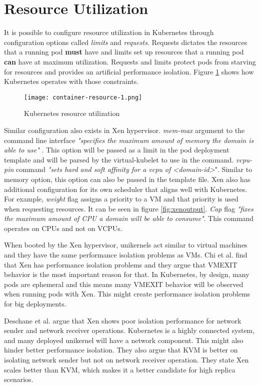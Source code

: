 \section{Resource Utilization}

It is possible to configure resource utilization in Kubernetes through configuration options called \textit{limits} and \textit{requests}. Requests dictates the resources that a running pod \textbf{must} have and limits set up resources that a running pod \textbf{can} have at maximum utilization. Requests and limits protect pods from starving for resources and provides an artificial performance isolation. Figure \ref{fig:limits} shows how Kubernetes operates with those constraints.
\begin{figure}
    \centering
    \texttt{[image: container-resource-1.png]}
    \caption{Kubernetes resource utilization \cite{limits}}\label{fig:limits}
\end{figure}

Similar configuration also exists in Xen hypervisor. \textit{mem-max} argument to the command line interface \textit{"specifies the maximum amount of memory the domain is able to use"} \cite{xl-man-page}. This option will be passed as a limit in the pod deployment template and will be parsed by the virtual-kubelet to use in the command. \textit{vcpu-pin} command \textit{"sets hard and soft affinity for a vcpu of <domain-id>}". Similar to memory option, this option can also be passed in the template file. Xen also has additional configuration for its own scheduler that aligns well with Kubernetes. For example, \textit{weight} flag assigns a priority to a VM and that priority is used when requesting resources. It can be seen in figure \ref{fig:xenoutput}. \textit{Cap} flag \textit{"fixes the maximum amount of CPU a domain will be able to consume"}. This command operates on CPUs and not on VCPUs.

When booted by the Xen hypervisor, unikernels act similar to virtual machines and they have the same performance isolation problems as VMs. Chi et al. \cite{performance-isolation} find that Xen has performance isolation problems and they argue that VMEXIT behavior is the most important reason for that. In Kubernetes, by design, many pods are ephemeral and this means many VMEXIT behavior will be observed when running pods with Xen. This might create performance isolation problems for big deployments.

Deschane et al. \cite{Deshane} argue that Xen shows poor isolation performance for network sender and network receiver operations. Kubernetes is a highly connected system, and many deployed unikernel will have a network component. This might also hinder better performance isolation. They also argue that KVM is better on isolating network sender but not on network receiver operation. They state Xen scales better than KVM, which makes it a better candidate for high replica scenarios.